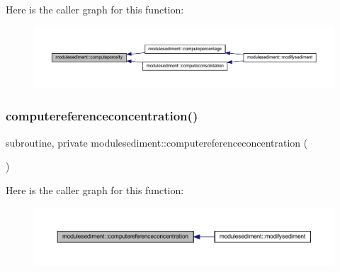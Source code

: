 Here is the caller graph for this function\+:\nopagebreak
\begin{figure}[H]
\begin{center}
\leavevmode
\includegraphics[width=350pt]{namespacemodulesediment_a12a98e7d5cf87fedaf983b4eb24c1633_icgraph}
\end{center}
\end{figure}
\mbox{\label{namespacemodulesediment_ab4eb31a619673958de47a8eb42ca39fa}} 
\subsubsection{\texorpdfstring{computereferenceconcentration()}{computereferenceconcentration()}}
{\footnotesize\ttfamily subroutine, private modulesediment\+::computereferenceconcentration (\begin{DoxyParamCaption}{ }\end{DoxyParamCaption})\hspace{0.3cm}{\ttfamily [private]}}

Here is the caller graph for this function\+:\nopagebreak
\begin{figure}[H]
\begin{center}
\leavevmode
\includegraphics[width=350pt]{namespacemodulesediment_ab4eb31a619673958de47a8eb42ca39fa_icgraph}
\end{center}
\end{figure}
\mbox{\label{namespacemodulesediment_ad51d2a28e0487a18346c78ef17c13307}} 
